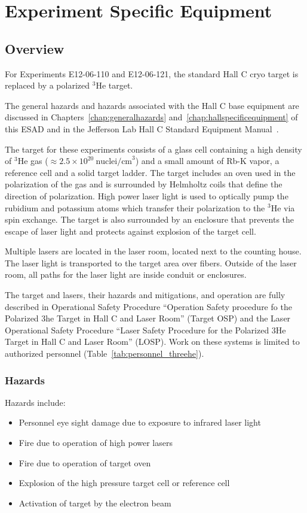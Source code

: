 \chapter{Experiment Specific Equipment}
\label{chap:expspecific}



\section{Overview}
For Experiments E12-06-110 and E12-06-121, the standard Hall C cryo
target is replaced by a polarized ${}^3$He target.

The general hazards and hazards associated with the Hall C base
equipment are discussed in Chapters~\ref{chap:generalhazards}
and~\ref{chap:hallspecificequipment} of this ESAD and in the Jefferson
Lab Hall C Standard Equipment Manual~\cite{HallCosp}.

The target for these experiments consists of a glass cell containing a
high density of ${}^3$He gas
($\approx 2.5 \times 10^{20}~\textrm{nuclei/cm}^3$)
and a small amount of Rb-K vapor, a reference cell and a solid target
ladder.  The target includes an oven used in the polarization of the
gas and is surrounded by Helmholtz coils that define the direction of
polarization.  High power laser light is used to optically pump the rubidium
and potassium atoms which transfer their polarization to the ${}^3$He
via spin exchange.
The target is also surrounded by an enclosure that prevents the escape of
laser light and protects against explosion of the target cell.

Multiple lasers are located in the laser room, located next to the counting
house.  The laser light is transported to the target area over
fibers.  Outside of the laser room, all paths for the laser light are
inside conduit or enclosures.

The target and lasers, their hazards and mitigations, and operation
are fully described in Operational Safety Procedure ``Operation Safety procedure fo the Polarized
3he Target in Hall C and Laser Room'' (Target OSP) and the Laser
Operational Safety Procedure ``Laser Safety Procedure for the
Polarized 3He Target in Hall C and Laser Room'' (LOSP).  Work on these
systems is limited to authorized personnel (Table~\ref{tab:personnel_threehe}).

\subsection{Hazards}
Hazards include:
\begin{itemize}
\item Personnel eye sight damage due to exposure to infrared laser
  light
\item Fire due to operation of high power lasers
\item Fire due to operation of target oven
\item Explosion of the high pressure target cell or reference cell
\item Activation of target by the electron beam
\end{itemize}

